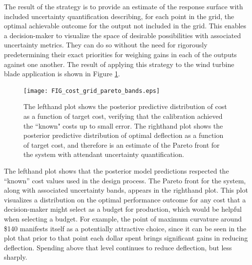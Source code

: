 \documentclass[12pt]{article}
\begin{document}
The result of the strategy is to provide an estimate of the response surface with included uncertainty quantification describing, for each point in the grid, the optimal achievable outcome for the output not included in the grid.
%
This enables a decision-maker to visualize the space of desirable possibilities with associated uncertainty metrics. 
%
They can do so without the need for rigorously predetermining their exact priorities for weighing gains in each of the outputs against one another.
%
The result of applying this strategy to the wind turbine blade application is shown in Figure \ref{fig:known_cost}. 
%
\begin{figure}
\centering
\texttt{[image: FIG\_cost\_grid\_pareto\_bands.eps]}
\caption{The lefthand plot shows the posterior predictive distribution of cost as a function of target cost, verifying that the calibration achieved the ``known" costs up to small error. The righthand plot shows the posterior predictive distribution of optimal deflection as a function of target cost, and therefore is an estimate of the Pareto front for the system with attendant uncertainty quantification.}
\label{fig:known_cost}
\end{figure}
%
The lefthand plot shows that the posterior model predictions respected the ``known'' cost values used in the design process.
%
The Pareto front for the system, along with associated uncertainty bands, appears in the righthand plot.
%
This plot visualizes a distribution on the optimal performance outcome for any cost that a decision-maker might select as a budget for production, which would be helpful when selecting a budget.
%
For example, the point of maximum curvature around \$140 manifests itself as a potentially attractive choice, since it can be seen in the plot that prior to that point each dollar spent brings significant gains in reducing deflection.
%
Spending above that level continues to reduce deflection, but less sharply.
\end{document}
